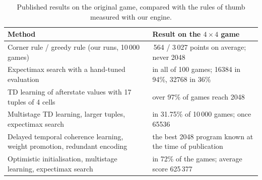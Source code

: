 \documentclass[11pt,a4paper]{article}
\theoremstyle{remark}
\begin{document}
\begin{table}[ht]
\centering\small
\begin{tabular}{>{\raggedright\arraybackslash}p{6.3cm}>{\raggedright\arraybackslash}p{6.9cm}}
\toprule
Method & Result on the $4\times4$ game\\
\midrule
Corner rule / greedy rule (our runs, 10\,000 games) & 2\,564 / 3\,027 points on average; never 2048\\
Expectimax search with a hand-tuned evaluation~\cite{nneonneo2014} & 2048 in all of 100 games; 16384 in 94\%, 32768 in 36\%\\
TD learning of afterstate values with 17 tuples of 4 cells~\cite{szubert2014} & over 97\% of games reach 2048\\
Multistage TD learning, larger tuples, expectimax search~\cite{yeh2017} & 32768 in 31.75\% of 10\,000 games; once 65536\\
Delayed temporal coherence learning, weight promotion, redundant encoding~\cite{jaskowski2018} & the best 2048 program known at the time of publication\\
Optimistic initialisation, multistage learning, expectimax search~\cite{guei2022} & 32768 in 72\% of the games; average score 625\,377\\
\bottomrule
\end{tabular}
\caption{Published results on the original game, compared with the rules of thumb measured with our engine.}
\label{tab:literature}
\end{table}
\end{document}
